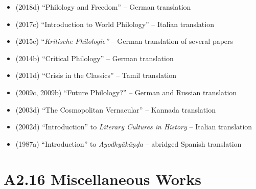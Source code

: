 \begin{itemize}
\item (2018d) “Philology and Freedom” – German translation

 \item (2017c) “Introduction to World Philology” – Italian translation

 \item (2015e) “\textit{Kritische Philologie”} – German translation of several papers

 \item (2014b) “Critical Philology” – German translation

 \item (2011d) “Crisis in the Classics” – Tamil translation

 \item (2009c, 2009b) “Future Philology?” – German and Russian translation

 \item (2003d) “The Cosmopolitan Vernacular” – Kannada translation

 \item (2002d) “Introduction” to \textit{Literary Cultures in History} – Italian translation

 \item (1987a) “Introduction” to \textit{Ayodhyākāṇḍa} – abridged Spanish translation

\end{itemize}


\section*{A2.16 Miscellaneous Works}

